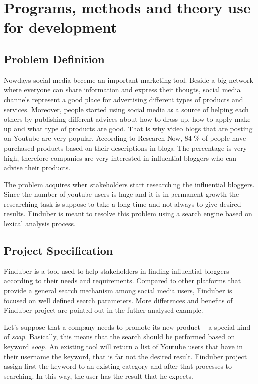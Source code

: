 \section{Programs, methods and theory use for development}

\subsection{Problem Definition}

Nowdays social media become an important marketing tool. Beside a big network where everyone can share information and express their thougts, social media channels represent a good place for advertising different types of products and services. Moreover, people started using social media as a source of helping each others by publishing different advices about how to dress up, how to apply make up and what type of products are good. That is why video blogs that are posting on Youtube are very popular. According to Research Now, 84 \% of people have purchased products based on their descriptions in blogs.\cite{cyber} The percentage is very high, therefore companies are very interested in influential bloggers who can advise their products. 

The problem acquires when stakeholders start researching the influential bloggers. Since the number of youtube users is huge and it is in permanent growth the researching task is suppose to take a long time and not always to give desired results. Finduber is meant to resolve this problem using a search engine based on lexical analysis process. 

\subsection{Project Specification}

Finduber is a tool used to help stakeholders in finding influential bloggers according to their needs and requirements. Compared to other platforms that provide a general search mechanism among social media users, Finduber is focused on well defined search parameters. More differences and benefits of Finduber project are pointed out in the futher analysed example. 

Let's suppose that a company needs to promote its new product -- a special kind of \textit{soap}. Basically, this means that the search should be performed based on keyword \textit{soap.} An existing tool will return a list of Youtube users that have in their username the keyword, that is far not the desired result. Finduber project assign first the keyword to an existing category and after that processes to searching. In this way, the user has the result that he expects.

